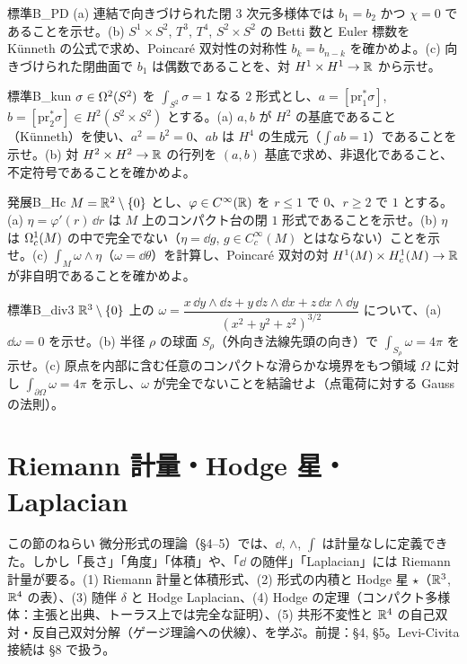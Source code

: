 \begin{probl}{標準}{B_PD}
(a) 連結で向きづけられた閉 $3$ 次元多様体では $b_1=b_2$ かつ $\chi=0$ であることを示せ。(b) $S^1\times S^2$, $T^3$, $T^4$, $S^2\times S^2$ の Betti 数と Euler 標数を Künneth の公式で求め、Poincaré 双対性の対称性 $b_k=b_{n-k}$ を確かめよ。(c) 向きづけられた閉曲面で $b_1$ は偶数であることを、対 $H^1\times H^1\to\mathbb R$ から示せ。
\end{probl}

\begin{probl}{標準}{B_kun}
$\sigma\in\Omega^2(S^2)$ を $\int_{S^2}\sigma=1$ なる $2$ 形式とし、$a=[\mathrm{pr}_1^*\sigma]$, $b=[\mathrm{pr}_2^*\sigma]\in H^2(S^2\times S^2)$ とする。(a) $a,b$ が $H^2$ の基底であること（Künneth）を使い、$a^2=b^2=0$、$ab$ は $H^4$ の生成元（$\int ab=1$）であることを示せ。(b) 対 $H^2\times H^2\to\mathbb R$ の行列を $(a,b)$ 基底で求め、非退化であること、不定符号であることを確かめよ。
\end{probl}

\begin{probl}{発展}{B_Hc}
$M=\mathbb R^2\setminus\{0\}$ とし、$\varphi\in C^\infty(\mathbb R)$ を $r\le1$ で $0$、$r\ge2$ で $1$ とする。(a) $\eta=\varphi'(r)\,\dd r$ は $M$ 上のコンパクト台の閉 $1$ 形式であることを示せ。(b) $\eta$ は $\Omega^1_c(M)$ の中で完全でない（$\eta=\dd g$, $g\in C^\infty_c(M)$ とはならない）ことを示せ。(c) $\int_M\omega\wedge\eta$（$\omega=\dd\theta$）を計算し、Poincaré 双対の対 $H^1(M)\times H^1_c(M)\to\mathbb R$ が非自明であることを確かめよ。
\end{probl}

\begin{probl}{標準}{B_div3}
$\mathbb R^3\setminus\{0\}$ 上の $\omega=\dfrac{x\,\dd y\wedge\dd z+y\,\dd z\wedge\dd x+z\,\dd x\wedge\dd y}{(x^2+y^2+z^2)^{3/2}}$ について、(a) $\dd\omega=0$ を示せ。(b) 半径 $\rho$ の球面 $S_\rho$（外向き法線先頭の向き）で $\int_{S_\rho}\omega=4\pi$ を示せ。(c) 原点を内部に含む任意のコンパクトな滑らかな境界をもつ領域 $\Omega$ に対し $\int_{\partial\Omega}\omega=4\pi$ を示し、$\omega$ が完全でないことを結論せよ（点電荷に対する Gauss の法則）。
\end{probl}

\section{Riemann 計量・Hodge 星・Laplacian}\label{B:sec6}

\begin{goalbox}{この節のねらい}
微分形式の理論（§4--5）では、$\dd$, $\wedge$, $\int$ は計量なしに定義できた。しかし「長さ」「角度」「体積」や、「$\dd$ の随伴」「Laplacian」には Riemann 計量が要る。(1) Riemann 計量と体積形式、(2) 形式の内積と Hodge 星 $\star$（$\mathbb R^3$, $\mathbb R^4$ の表）、(3) 随伴 $\delta$ と Hodge Laplacian、(4) Hodge の定理（コンパクト多様体：主張と出典、トーラス上では完全な証明）、(5) 共形不変性と $\mathbb R^4$ の自己双対・反自己双対分解（ゲージ理論への伏線）、を学ぶ。前提：§4, §5。Levi-Civita 接続は §8 で扱う。
\end{goalbox}

